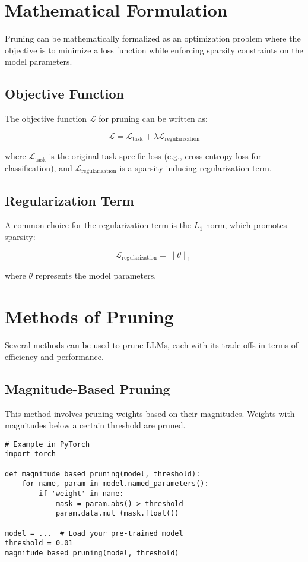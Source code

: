 \section{Mathematical Formulation}
Pruning can be mathematically formalized as an optimization problem where the objective is to minimize a loss function while enforcing sparsity constraints on the model parameters.

\subsection{Objective Function}
The objective function \( \mathcal{L} \) for pruning can be written as:

\begin{equation}
\mathcal{L} = \mathcal{L}_{\text{task}} + \lambda \mathcal{L}_{\text{regularization}}
\end{equation}

where \( \mathcal{L}_{\text{task}} \) is the original task-specific loss (e.g., cross-entropy loss for classification), and \( \mathcal{L}_{\text{regularization}} \) is a sparsity-inducing regularization term.

\subsection{Regularization Term}
A common choice for the regularization term is the \( L_1 \) norm, which promotes sparsity:

\begin{equation}
\mathcal{L}_{\text{regularization}} = \| \theta \|_1
\end{equation}

where \( \theta \) represents the model parameters.

\section{Methods of Pruning}
Several methods can be used to prune LLMs, each with its trade-offs in terms of efficiency and performance.

\subsection{Magnitude-Based Pruning}
This method involves pruning weights based on their magnitudes. Weights with magnitudes below a certain threshold are pruned.

\begin{verbatim}
# Example in PyTorch
import torch

def magnitude_based_pruning(model, threshold):
    for name, param in model.named_parameters():
        if 'weight' in name:
            mask = param.abs() > threshold
            param.data.mul_(mask.float())

model = ...  # Load your pre-trained model
threshold = 0.01
magnitude_based_pruning(model, threshold)
\end{verbatim}


